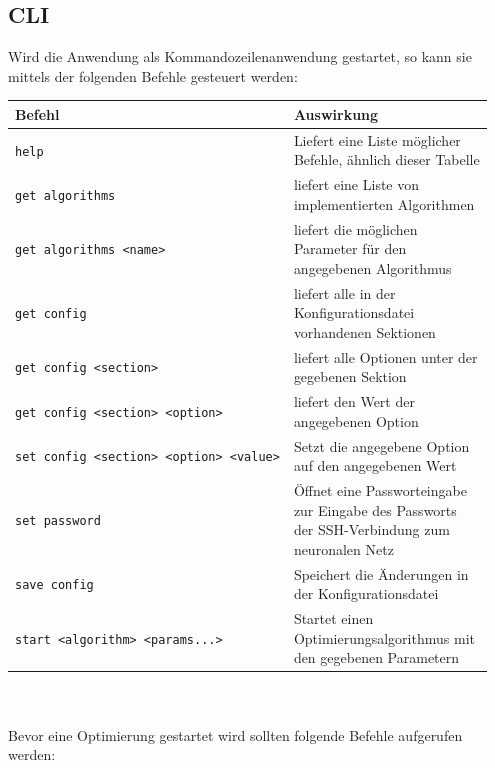 \documentclass[
  a4paper,               %
  twoside,               %
  DIV=12,                %
  BCOR=8mm,              %
  headinclude=true,      %
  footinclude=false,     %
  numbers=noenddot,      %
  headheight=40pt,       %
  11pt]{scrartcl}        %
\begin{document}
\subsection{CLI}
Wird die Anwendung als Kommandozeilenanwendung gestartet, so kann sie mittels der folgenden Befehle gesteuert werden:\\
\begin{tabular}{p{0.4\linewidth}|p{0.55\linewidth}}
	\toprule
	Befehl & Auswirkung\tabularnewline
	\midrule
	\texttt{help} & Liefert eine Liste möglicher Befehle, ähnlich dieser
	Tabelle\tabularnewline
	\texttt{get\ algorithms} & liefert eine Liste von implementierten
		Algorithmen\tabularnewline
	\texttt{get\ algorithms\ \textless{}name\textgreater{}} & liefert die
	möglichen Parameter für den angegebenen Algorithmus\tabularnewline
	\texttt{get\ config} & liefert alle in der Konfigurationsdatei
	vorhandenen Sektionen\tabularnewline
	\texttt{get\ config\ \textless{}section\textgreater{}} & liefert alle
	Optionen unter der gegebenen Sektion\tabularnewline
	\texttt{get\ config\ \textless{}section\textgreater{}\ \textless{}option\textgreater{}}
	& liefert den Wert der angegebenen Option\tabularnewline
	\texttt{set\ config\ \textless{}section\textgreater{}\ \textless{}option\textgreater{}\ \textless{}value\textgreater{}}
	& Setzt die angegebene Option auf den angegebenen Wert\tabularnewline
	\texttt{set\ password} & Öffnet eine Passworteingabe zur Eingabe des
	Passworts der SSH-Verbindung zum neuronalen Netz\tabularnewline
	\texttt{save\ config} & Speichert die Änderungen in der
	Konfigurationsdatei\tabularnewline
	\texttt{start\ \textless{}algorithm\textgreater{}\ \textless{}params...\textgreater{}}
	& Startet einen Optimierungsalgorithmus mit den gegebenen
	Parametern\tabularnewline
	\bottomrule
\end{tabular}\\
\newline\\
Bevor eine Optimierung gestartet wird sollten folgende Befehle
aufgerufen werden:\\
\end{document}
